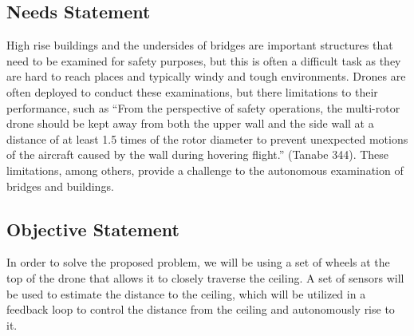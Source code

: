 \documentclass[12pt]{article}
\begin{document}
        \subsection{Needs Statement}
            High rise buildings and the undersides of bridges are important structures that need to be examined for safety purposes, but this is often a difficult task as they are hard to reach places and typically windy and tough environments. Drones are often deployed to conduct these examinations, but there limitations to their performance, such as “From the perspective of safety operations, the multi-rotor drone should be kept away from both the upper wall and the side wall at a distance of at least 1.5 times of the rotor diameter to prevent unexpected motions of the aircraft caused by the wall during hovering flight.” (Tanabe 344). These limitations, among others, provide a challenge to the autonomous examination of bridges and buildings.

        \subsection{Objective Statement}
            In order to solve the proposed problem, we will be using a set of wheels at the top of the drone that allows it to closely traverse the ceiling. A set of sensors will be used to estimate the distance to the ceiling, which will be utilized in a feedback loop to control the distance from the ceiling and autonomously rise to it.

        \newpage
\end{document}

